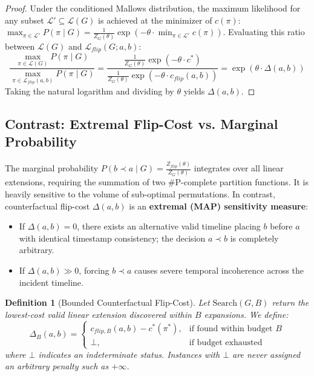 \documentclass[journal]{IEEEtran}
\newtheorem{definition}{Definition}
\begin{document}
\begin{proof}
Under the conditioned Mallows distribution, the maximum likelihood for any subset $\mathcal{L}' \subseteq \mathcal{L}(G)$ is achieved at the minimizer of $c(\pi)$: $\max_{\pi \in \mathcal{L}'} P(\pi \mid G) = \frac{1}{Z_G(\theta)} \exp(-\theta \cdot \min_{\pi \in \mathcal{L}'} c(\pi))$. Evaluating this ratio between $\mathcal{L}(G)$ and $\mathcal{L}_{flip}(G; a, b)$:
\begin{equation}
\frac{\max_{\pi \in \mathcal{L}(G)} P(\pi \mid G)}{\max_{\pi \in \mathcal{L}_{flip}(a, b)} P(\pi \mid G)} = \frac{\frac{1}{Z_G(\theta)} \exp(-\theta \cdot c^*)}{\frac{1}{Z_G(\theta)} \exp(-\theta \cdot c_{flip}(a, b))} = \exp(\theta \cdot \Delta(a, b))
\end{equation}
Taking the natural logarithm and dividing by $\theta$ yields $\Delta(a, b)$.
\end{proof}

\subsection{Contrast: Extremal Flip-Cost vs. Marginal Probability}
The marginal probability $P(b \prec a \mid G) = \frac{Z_{flip}(\theta)}{Z_G(\theta)}$ integrates over all linear extensions, requiring the summation of two $\#\text{P}$-complete partition functions. It is heavily sensitive to the volume of sub-optimal permutations. In contrast, counterfactual flip-cost $\Delta(a, b)$ is an \textbf{extremal (MAP) sensitivity measure}:
\begin{itemize}
    \item If $\Delta(a, b) = 0$, there exists an alternative valid timeline placing $b$ before $a$ with identical timestamp consistency; the decision $a \prec b$ is completely arbitrary.
    \item If $\Delta(a, b) \gg 0$, forcing $b \prec a$ causes severe temporal incoherence across the incident timeline.
\end{itemize}

\begin{definition}[Bounded Counterfactual Flip-Cost]
Let $\text{Search}(G, B)$ return the lowest-cost valid linear extension discovered within $B$ expansions. We define:
\begin{equation}
\Delta_B(a, b) = \begin{cases} c_{flip, B}(a, b) - c^*(\pi^*), & \text{if found within budget } B \\ \bot, & \text{if budget exhausted} \end{cases}
\end{equation}
where $\bot$ indicates an indeterminate status. Instances with $\bot$ are never assigned an arbitrary penalty such as $+\infty$.
\end{definition}
\end{document}
